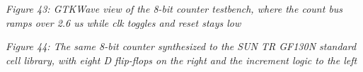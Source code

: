 \begin{Shaded}
\begin{Highlighting}[]
\OperatorTok{(}
               \OperatorTok{[}\OperatorTok{:}\OperatorTok{]}\OperatorTok{,}
               \OperatorTok{,}
               \OperatorTok{);}

   \OperatorTok{=} \OperatorTok{;}

\OperatorTok{[}\OperatorTok{:}\OperatorTok{]}\OperatorTok{;}
\OperatorTok{=}\OperatorTok{+} \OperatorTok{;}

 \OperatorTok{)} 
       \OperatorTok{(}\OperatorTok{)}
\OperatorTok{\textless{}=} \OperatorTok{;}
\OperatorTok{\textless{}=}\OperatorTok{;}

 
\end{Highlighting}
\end{Shaded}


{
\centering
{}
}

\emph{Figure 43: GTKWave view of the 8-bit counter testbench, where the
count bus ramps over 2.6 us while clk toggles and reset stays low}


{
\centering
{}
}

\emph{Figure 44: The same 8-bit counter synthesized to the SUN TR GF130N
standard cell library, with eight D flip-flops on the right and the
increment logic to the left}

